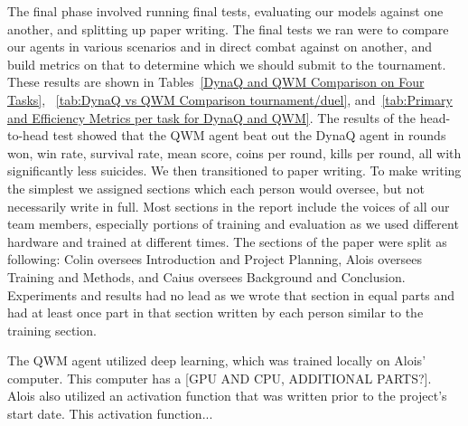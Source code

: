 \documentclass[article, 10pt]{IEEEtran}
\begin{document}
The final phase involved running final tests, evaluating our models against one another, and splitting up paper writing. The final tests we ran were to compare our agents in various scenarios and in direct combat against on another, and build metrics on that to determine which we should submit to the tournament. These results are shown in Tables~\ref{DynaQ and QWM Comparison on Four Tasks}, ~\ref{tab:DynaQ vs QWM Comparison tournament/duel}, and~\ref{tab:Primary and Efficiency Metrics per task for DynaQ and QWM}. The results of the head-to-head test showed that the QWM agent beat out the DynaQ agent in rounds won, win rate, survival rate, mean score, coins per round, kills per round, all with significantly less suicides. We then transitioned to paper writing. To make writing the simplest we assigned sections which each person would oversee, but not necessarily write in full. Most sections in the report include the voices of all our team members, especially portions of training and evaluation as we used different hardware and trained at different times. The sections of the paper were split as following: Colin oversees Introduction and Project Planning, Alois oversees Training and Methods, and Caius oversees Background and Conclusion. Experiments and results had no lead as we wrote that section in equal parts and had at least once part in that section written by each person similar to the training section.

The QWM agent utilized deep learning, which was trained locally on Alois' computer. This computer has a [GPU AND CPU, ADDITIONAL PARTS?]. Alois also utilized an activation function that was written prior to the project's start date. This activation function...



\end{document}
